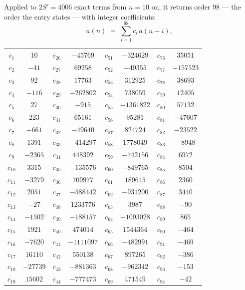 \documentclass[11pt,a4paper]{article}
\theoremstyle{plain}
\theoremstyle{definition}
\begin{document}
Applied to $2S'=4006$ exact terms from $n=10$ on, it returns order $98$ --- the
order the entry states --- with integer coefficients:
\[
a(n)\;=\;\sum_{i=1}^{98}c_i\,a(n-i),
\]
\begin{center}\small
\begin{tabular}{cccccccc}
$c_{1}$ & $10$ & $c_{26}$ & $-45769$ & $c_{51}$ & $-324629$ & $c_{76}$ & $35051$ \\
$c_{2}$ & $-41$ & $c_{27}$ & $69258$ & $c_{52}$ & $-49355$ & $c_{77}$ & $-157523$ \\
$c_{3}$ & $92$ & $c_{28}$ & $17763$ & $c_{53}$ & $312925$ & $c_{78}$ & $38693$ \\
$c_{4}$ & $-116$ & $c_{29}$ & $-262802$ & $c_{54}$ & $738059$ & $c_{79}$ & $12405$ \\
$c_{5}$ & $27$ & $c_{30}$ & $-915$ & $c_{55}$ & $-1361822$ & $c_{80}$ & $57132$ \\
$c_{6}$ & $223$ & $c_{31}$ & $65161$ & $c_{56}$ & $95281$ & $c_{81}$ & $-47607$ \\
$c_{7}$ & $-661$ & $c_{32}$ & $-49640$ & $c_{57}$ & $824724$ & $c_{82}$ & $-23522$ \\
$c_{8}$ & $1391$ & $c_{33}$ & $-414297$ & $c_{58}$ & $1778049$ & $c_{83}$ & $-8948$ \\
$c_{9}$ & $-2365$ & $c_{34}$ & $448392$ & $c_{59}$ & $-742156$ & $c_{84}$ & $6972$ \\
$c_{10}$ & $3315$ & $c_{35}$ & $-135576$ & $c_{60}$ & $-849765$ & $c_{85}$ & $8504$ \\
$c_{11}$ & $-3279$ & $c_{36}$ & $709977$ & $c_{61}$ & $189645$ & $c_{86}$ & $2360$ \\
$c_{12}$ & $2051$ & $c_{37}$ & $-588442$ & $c_{62}$ & $-931200$ & $c_{87}$ & $3440$ \\
$c_{13}$ & $-27$ & $c_{38}$ & $1233776$ & $c_{63}$ & $3987$ & $c_{88}$ & $-90$ \\
$c_{14}$ & $-1502$ & $c_{39}$ & $-188157$ & $c_{64}$ & $-1093028$ & $c_{89}$ & $865$ \\
$c_{15}$ & $1921$ & $c_{40}$ & $474014$ & $c_{65}$ & $1544364$ & $c_{90}$ & $-464$ \\
$c_{16}$ & $-7620$ & $c_{41}$ & $-1111097$ & $c_{66}$ & $-482991$ & $c_{91}$ & $-469$ \\
$c_{17}$ & $16110$ & $c_{42}$ & $550138$ & $c_{67}$ & $897265$ & $c_{92}$ & $-386$ \\
$c_{18}$ & $-27739$ & $c_{43}$ & $-881363$ & $c_{68}$ & $-962342$ & $c_{93}$ & $-153$ \\
$c_{19}$ & $15602$ & $c_{44}$ & $-777473$ & $c_{69}$ & $471549$ & $c_{94}$ & $-42$ \\

\end{tabular}
\end{center}
\end{document}
